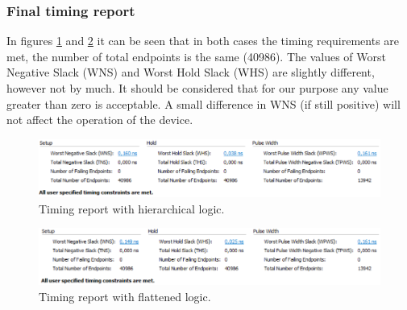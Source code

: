 \subsubsection{Final timing report}
\noindent In figures \ref{fig:noflattiming} and \ref{fig:flattiming} it can be seen that in both cases the timing requirements are met, the number of total endpoints is the same (40986). The values of Worst Negative Slack (WNS) and Worst Hold Slack (WHS) are slightly different, however not by much. It should be considered that for our purpose any value greater than zero is acceptable.
A small difference in WNS (if still positive) will not affect the operation of the device.  
\begin{figure}[H]
	\centering
	\includegraphics[width=0.8\linewidth]{IMG/ch4/FirmwareNOFLAT/TIMING}
	\caption{Timing report with hierarchical logic.}
	\label{fig:noflattiming}
\end{figure}

\begin{figure}[H]
	\centering
	\includegraphics[width=0.8\linewidth]{IMG/ch4/FirmwareFLAT/TIMING}
	\caption{Timing report with flattened logic.}
	\label{fig:flattiming}
\end{figure}

